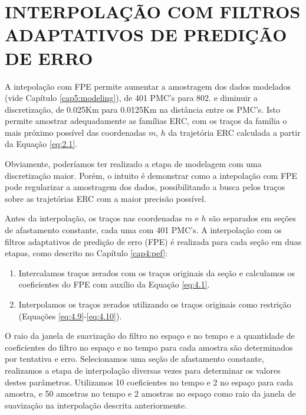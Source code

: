 %
% 
% 
% 
% 
% 
% 

\chapter{INTERPOLAÇÃO COM FILTROS ADAPTATIVOS DE PREDIÇÃO DE ERRO}
\label{cap6:interpolacao}

A intepolação com FPE permite aumentar a amostragem dos dados modelados (vide Capítulo \ref{cap5:modeling}),
de 401 PMC's para 802.
e diminuir a discretização, de 0.025Km para 0.0125Km na distância entre os PMC's.
Isto permite amostrar adequadamente as famílias ERC, com os traços da família o mais próximo possível
das coordenadas $m$, $h$ da trajetória ERC calculada a partir da Equação \ref{eq:2.1}.

Obviamente, poderíamos ter realizado a etapa de modelagem com uma discretização maior. Porém, o intuito é demonstrar como
a intepolação com FPE pode regularizar a amostragem dos dados, possibilitando a busca pelos
traços sobre as trajetórias ERC com a maior precisão possível.

Antes da interpolação, os traços nas coordenadas $m$ e $h$ são separados em seções de afastamento constante, 
cada uma com 401 PMC's.
A interpolação com os filtros adaptativos de predição de erro (FPE) é realizada para cada seção em duas etapas,
como descrito no Capítulo \ref{cap4:pef}:

\begin{enumerate}
 \item Intercalamos traços zerados com os traços originais da seção e calculamos os coeficientes do FPE
 com auxílio da Equação \ref{eq:4.1}.
 
 \item Interpolamos os traços zerados utilizando os traços originais como restrição (Equações \ref{eq:4.9}-\ref{eq:4.10}).
\end{enumerate}

O raio da janela de suavização do filtro no espaço e no tempo e a quantidade de coeficientes do filtro no espaço e no
tempo para cada amostra são determinados por tentativa e erro. Selecionamos uma seção de afastamento constante, realizamos a
etapa de interpolação diversas vezes para determinar os valores destes parâmetros. Utilizamos 10 coeficientes no tempo e 2 no
espaço para cada amostra, e 50 amostras no tempo e 2 amostras no espaço como raio da janela de suavização na interpolação descrita
anteriormente.


